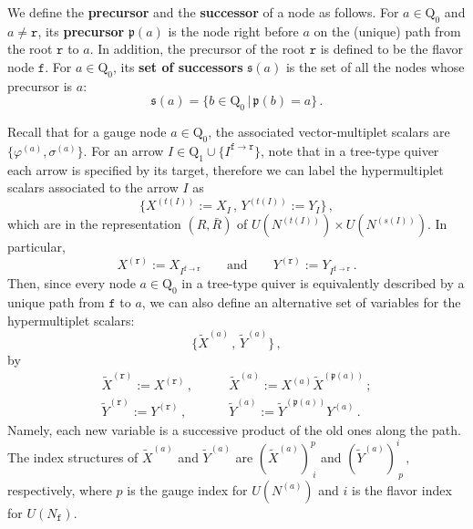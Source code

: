 \documentclass[12pt,a4paper]{article}
\renewcommand{\(}{\left(}
\renewcommand{\)}{\right)}
\renewcommand{\(}{\left(}
\renewcommand{\)}{\right)}
\begin{document}
\medskip


We define the \textbf{precursor} and the \textbf{successor} of a node as follows.
For $a\in \mathrm{Q}_0$ and
$ a\neq \mathtt{r}$, its \textbf{precursor} $\mathfrak{p}(a)$ is the node right before $a$ on the (unique) path from the root $\mathtt{r}$ to $a$. 
In addition, the precursor of the root $\mathtt{r}$ is defined to be the flavor node $\mathtt{f}$.
For $a\in \mathrm{Q}_0$, its \textbf{set of successors} $\mathfrak{s}(a)$ is the set of all the nodes whose precursor is $a$: 
\begin{equation}
\mathfrak{s}(a)=\{b\in \mathrm{Q}_0 \,|\, \mathfrak{p}(b)=a\}\,.    
\end{equation}


\medskip

Recall that for a gauge node $a\in \mathrm{Q}_0$, the associated vector-multiplet scalars are $\{\varphi^{(a)},\sigma^{(a)}\}$. 
For an arrow $I\in \textrm{Q}_1\cup\{I^{\mathtt{f}\to\mathtt{r}}\}$, note that in a tree-type quiver each arrow is specified by its target, therefore we can label the hypermultiplet scalars associated to the arrow $I$ as 
\begin{equation}\label{eq:XY_by_target}
\{X^{(t(I))}:=X_I\, ,\, Y^{(t(I))}:=Y_I\}\,,    
\end{equation}
which are in the representation $(R,\bar{R})$ of $U(N^{(t(I))})\times U(N^{(s(I))})$.
In particular,
\begin{equation}
X^{(\mathtt{r})}:=X_{I^{\mathtt{f}\rightarrow \mathtt{r}}}
\qquad\textrm{and}\qquad
Y^{(\mathtt{r})}:=Y_{I^{\mathtt{f}\rightarrow \mathtt{r}}} \,.
\end{equation}
Then, since every node $a\in \mathrm{Q}_0$ in a tree-type quiver is equivalently described by a unique path from $\mathtt{f}$ to $a$, we can also define an alternative set of variables for the hypermultiplet scalars:
\begin{equation}\label{eq:XYtilde}
\{\tilde{X}^{(a)}\, ,\, \tilde{Y}^{(a)}\}\,,    
\end{equation}
by
\begin{equation}\label{eq:X_nest}
\begin{aligned}
\tilde{X}^{(\mathtt{r})}:=X^{(\mathtt{r})}\,, &\qquad \tilde{X}^{(a)}:=X^{(a)}\tilde{X}^{(\mathfrak{p}(a))}\,;\\
\tilde{Y}^{(\mathtt{r})}:=Y^{(\mathtt{r})}\,, &\qquad \tilde{Y}^{(a)}:=\tilde{Y}^{(\mathfrak{p}(a))}Y^{(a)}\,.
\end{aligned}    
\end{equation}
Namely, each new variable is a successive product of the old ones along the path. 
The index structures of $\tilde{X}^{(a)}$ and $\tilde{Y}^{(a)}$ are  $(\tilde{X}^{(a)})^{p}_{\ i}$ and $(\tilde{Y}^{(a)})^{i}_{\ p}\,,$ respectively, where 
$p$ is the gauge index for $U(N^{(a)})$ and $i$ is the flavor index for $U(N_\mathtt{f})$.
\end{document}
